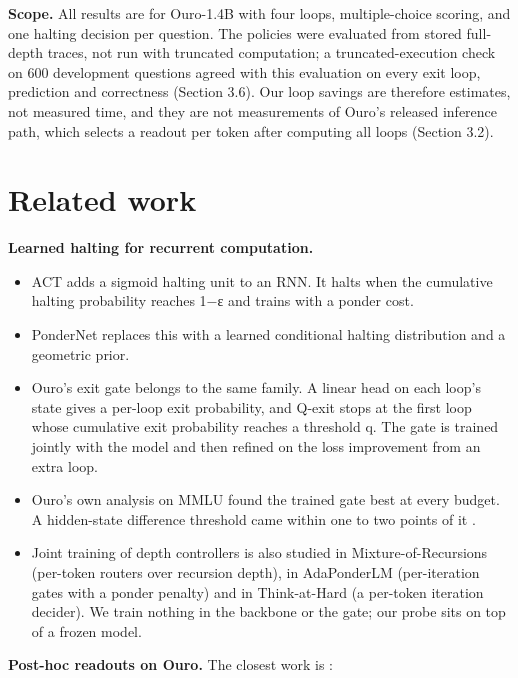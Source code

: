 \textbf{Scope.} All results are for Ouro-1.4B with four loops, multiple-choice scoring, and one halting decision per question. The policies were
evaluated from stored full-depth traces, not run with truncated computation; a truncated-execution check on 600 development questions agreed with this evaluation on every exit loop, prediction and correctness (Section 3.6). Our loop savings are therefore estimates, not measured time,
and they are not measurements of Ouro's released inference path, which selects a readout per token after computing all loops (Section 3.2).

\section{Related work}

\textbf{Learned halting for recurrent computation.}

\begin{itemize}
\tightlist
\item
  ACT \citep{Graves2016} adds a sigmoid halting unit to an RNN. It halts when the cumulative halting probability reaches 1−ε and trains with a
  ponder cost.
\item
  PonderNet \citep{Banino2021} replaces this with a learned conditional halting distribution and a geometric prior.
\item
  Ouro's exit gate \citep{Zhu2025} belongs to the same family. A linear head on each loop's state gives a per-loop exit probability, and Q-exit
  stops at the first loop whose cumulative exit probability reaches a threshold q. The gate is trained jointly with the model and then
  refined on the loss improvement from an extra loop.
\item
  Ouro's own analysis on MMLU found the trained gate best at every budget. A hidden-state difference threshold came within one to two
  points of it \citep[section 5.4.1]{Zhu2025}.
\item
  Joint training of depth controllers is also studied in Mixture-of-Recursions \citep{Bae2025} (per-token routers over recursion depth), in
  AdaPonderLM \citep{Song2026} (per-iteration gates with a ponder penalty) and in Think-at-Hard \citep{Fu2025} (a per-token iteration decider). We train
  nothing in the backbone or the gate; our probe sits on top of a frozen model.
\end{itemize}

\textbf{Post-hoc readouts on Ouro.} The closest work is \citet{Popescu2026}:

